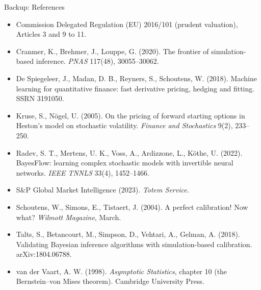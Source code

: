 \documentclass[aspectratio=169]{beamer}
\begin{document}
\begin{frame}{Backup: References}
\scriptsize
\begin{itemize}
\item Commission Delegated Regulation (EU) 2016/101 (prudent valuation), Articles 3 and 9 to 11.
\item Cranmer, K., Brehmer, J., Louppe, G. (2020). The frontier of simulation-based inference. \textit{PNAS} 117(48),
30055–30062.
\item De Spiegeleer, J., Madan, D. B., Reyners, S., Schoutens, W. (2018). Machine learning for quantitative finance:
fast derivative pricing, hedging and fitting. SSRN 3191050.
\item Kruse, S., Nögel, U. (2005). On the pricing of forward starting options in Heston's model on stochastic
volatility. \textit{Finance and Stochastics} 9(2), 233–250.
\item Radev, S. T., Mertens, U. K., Voss, A., Ardizzone, L., Köthe, U. (2022). BayesFlow: learning complex stochastic
models with invertible neural networks. \textit{IEEE TNNLS} 33(4), 1452–1466.
\item S\&P Global Market Intelligence (2023). \textit{Totem Service}.
\item Schoutens, W., Simons, E., Tistaert, J. (2004). A perfect calibration! Now what? \textit{Wilmott Magazine}, March.
\item Talts, S., Betancourt, M., Simpson, D., Vehtari, A., Gelman, A. (2018). Validating Bayesian inference algorithms
with simulation-based calibration. arXiv:1804.06788.
\item van der Vaart, A. W. (1998). \textit{Asymptotic Statistics}, chapter 10 (the Bernstein–von Mises theorem).
Cambridge University Press.
\end{itemize}
\end{frame}
\end{document}
